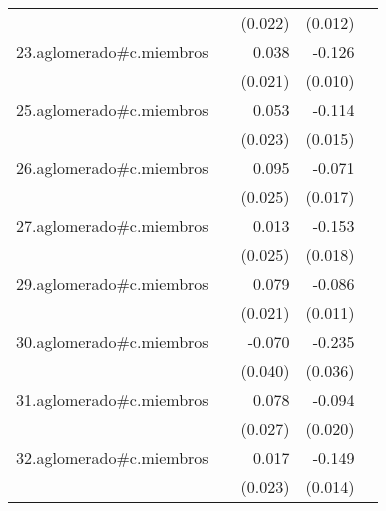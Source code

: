{\begin{longtable}{l*{4}{D{.}{.}{-1}}}
            &                     &     (0.022)         &     (0.012)         &                     \\
\addlinespace
23.aglomerado#c.miembros&                     &       0.038         &      -0.126\sym{***}&                     \\
            &                     &     (0.021)         &     (0.010)         &                     \\
\addlinespace
25.aglomerado#c.miembros&                     &       0.053\sym{*}  &      -0.114\sym{***}&                     \\
            &                     &     (0.023)         &     (0.015)         &                     \\
\addlinespace
26.aglomerado#c.miembros&                     &       0.095\sym{***}&      -0.071\sym{***}&                     \\
            &                     &     (0.025)         &     (0.017)         &                     \\
\addlinespace
27.aglomerado#c.miembros&                     &       0.013         &      -0.153\sym{***}&                     \\
            &                     &     (0.025)         &     (0.018)         &                     \\
\addlinespace
29.aglomerado#c.miembros&                     &       0.079\sym{***}&      -0.086\sym{***}&                     \\
            &                     &     (0.021)         &     (0.011)         &                     \\
\addlinespace
30.aglomerado#c.miembros&                     &      -0.070         &      -0.235\sym{***}&                     \\
            &                     &     (0.040)         &     (0.036)         &                     \\
\addlinespace
31.aglomerado#c.miembros&                     &       0.078\sym{**} &      -0.094\sym{***}&                     \\
            &                     &     (0.027)         &     (0.020)         &                     \\
\addlinespace
32.aglomerado#c.miembros&                     &       0.017         &      -0.149\sym{***}&                     \\
            &                     &     (0.023)         &     (0.014)         &                     \\

\end{longtable}}
